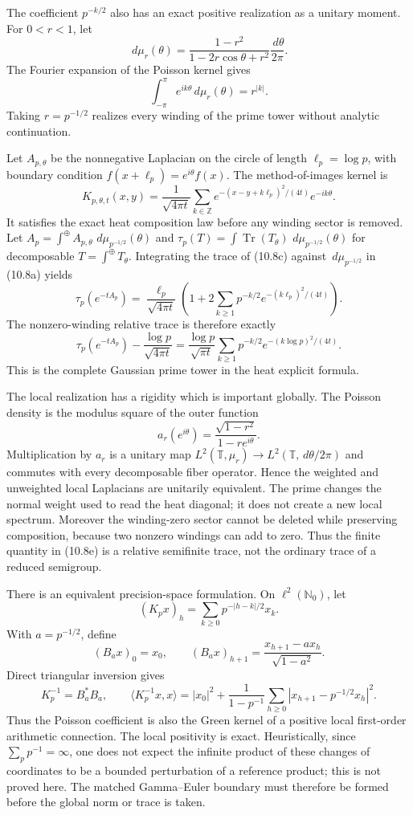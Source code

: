 \documentclass[11pt]{amsart}
\theoremstyle{definition}
\theoremstyle{remark}
\newcommand{\dd}{\,d}
\DeclareMathOperator{\Tr}{Tr}
\begin{document}
The coefficient \(p^{-k/2}\) also has an exact positive realization as a
unitary moment.  For \(0<r<1\), let
\[
 \dd\mu_r(\theta)
 =\frac{1-r^2}{1-2r\cos\theta+r^2}\frac{\dd\theta}{2\pi}.
\tag{10.8a}
\]
The Fourier expansion of the Poisson kernel gives
\[
 \int_{-\pi}^{\pi}e^{ik\theta}\dd\mu_r(\theta)=r^{|k|}.
\tag{10.8b}
\]
Taking \(r=p^{-1/2}\) realizes every winding of the prime tower without
analytic continuation.

Let \(A_{p,\theta}\) be the nonnegative Laplacian on the circle of length
\(\ell_p=\log p\), with boundary condition
\(f(x+\ell_p)=e^{i\theta}f(x)\).  The method-of-images kernel is
\[
 K_{p,\theta,t}(x,y)
 =\frac1{\sqrt{4\pi t}}
  \sum_{k\in\mathbb Z}
  e^{-(x-y+k\ell_p)^2/(4t)}e^{-ik\theta}.
\tag{10.8c}
\]
It satisfies the exact heat composition law before any winding sector is
removed.  Let \(A_p=\int^\oplus A_{p,\theta}\,\dd\mu_{p^{-1/2}}(\theta)\) and
\(\tau_p(T)=\int\Tr(T_\theta)\,\dd\mu_{p^{-1/2}}(\theta)\) for decomposable
\(T=\int^\oplus T_\theta\).  Integrating the trace of (10.8c) against
\(\dd\mu_{p^{-1/2}}\) in (10.8a) yields
\[
 \boxed{
 \tau_p(e^{-tA_p})
 =\frac{\ell_p}{\sqrt{4\pi t}}
  \left(1+2\sum_{k\ge1}p^{-k/2}
  e^{-(k\ell_p)^2/(4t)}\right).}
\tag{10.8d}
\]
The nonzero-winding relative trace is therefore exactly
\[
 \tau_p(e^{-tA_p})-\frac{\log p}{\sqrt{4\pi t}}
 =\frac{\log p}{\sqrt{\pi t}}
  \sum_{k\ge1}p^{-k/2}e^{-(k\log p)^2/(4t)}.
\tag{10.8e}
\]
This is the complete Gaussian prime tower in the heat explicit formula.

The local realization has a rigidity which is important globally.  The
Poisson density is the modulus square of the outer function
\[
 a_r(e^{i\theta})=\frac{\sqrt{1-r^2}}{1-re^{i\theta}}.
\tag{10.8f}
\]
Multiplication by \(a_r\) is a unitary map
\(L^2(\mathbb T,\mu_r)\to L^2(\mathbb T,\dd\theta/2\pi)\) and commutes
with every decomposable fiber operator.  Hence the weighted and unweighted
local Laplacians are unitarily equivalent.  The prime changes the normal
weight used to read the heat diagonal; it does not create a new local
spectrum.  Moreover the winding-zero sector cannot be deleted while
preserving composition, because two nonzero windings can add to zero.
Thus the finite quantity in (10.8e) is a relative semifinite trace, not the
ordinary trace of a reduced semigroup.

There is an equivalent precision-space formulation.  On
\(\ell^2(\mathbb N_0)\), let
\[
 (K_px)_{h}=\sum_{k\ge0}p^{-|h-k|/2}x_k.
\]
With \(a=p^{-1/2}\), define
\[
 (B_ax)_0=x_0,
 \qquad
 (B_ax)_{h+1}=\frac{x_{h+1}-ax_h}{\sqrt{1-a^2}}.
\tag{10.8g}
\]
Direct triangular inversion gives
\[
 \boxed{
 K_p^{-1}=B_a^*B_a,
 \qquad
 \langle K_p^{-1}x,x\rangle
 =|x_0|^2+\frac1{1-p^{-1}}
  \sum_{h\ge0}|x_{h+1}-p^{-1/2}x_h|^2.}
\tag{10.8h}
\]
Thus the Poisson coefficient is also the Green kernel of a positive local
first-order arithmetic connection.  The local positivity is exact.  Heuristically, since
\(\sum_p p^{-1}=\infty\), one does not expect the infinite product of these
changes of coordinates to be a bounded perturbation of a reference product;
this is not proved here.
The matched Gamma--Euler boundary must therefore be formed before the
global norm or trace is taken.
\end{document}

